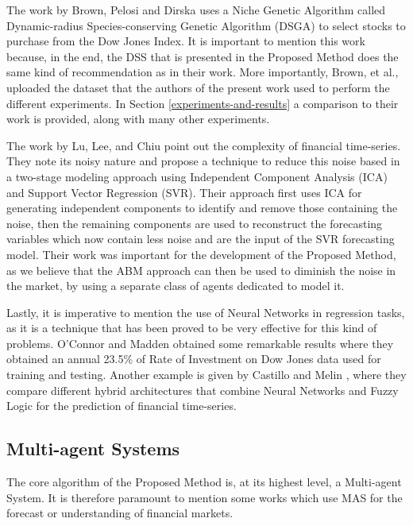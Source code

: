 \documentclass[12pt,journal,draftcls,onecolumn]{IEEEtran}
\begin{document}
The work by Brown, Pelosi and Dirska \cite{brown2013dynamic} uses a Niche Genetic Algorithm called Dynamic-radius Species-conserving Genetic Algorithm (DSGA) to select stocks to purchase from the Dow Jones Index. It is important to mention this work because, in the end, the DSS that is presented in the Proposed Method does the same kind of recommendation as in their work. More importantly, Brown, et al., uploaded the dataset that the authors of the present work used to perform the different experiments. In Section \ref{experiments-and-results} a comparison to their work is provided, along with many other experiments.

The work by Lu, Lee, and Chiu \cite{Lu2009} point out the complexity of financial time-series. They note its noisy nature and propose a technique to reduce this noise based in a two-stage modeling approach using Independent Component Analysis (ICA) and Support Vector Regression (SVR). Their approach first uses ICA for generating independent components to identify and remove those containing the noise, then the remaining components are used to reconstruct the forecasting variables which now contain less noise and are the input of the SVR forecasting model. Their work was important for the development of the Proposed Method, as we believe that the ABM approach can then be used to diminish the noise in the market, by using a separate class of agents dedicated to model it.

Lastly, it is imperative to mention the use of Neural Networks in regression tasks, as it is a technique that has been proved to be very effective for this kind of problems. O'Connor and Madden \cite{Connor2005} obtained some remarkable results where they obtained an annual 23.5\% of Rate of Investment on Dow Jones data used for training and testing. Another example is given by Castillo and Melin \cite{castillo2001simulation}, where they compare different hybrid architectures that combine Neural Networks and Fuzzy Logic for the prediction of financial time-series.

\subsection{Multi-agent Systems}
\label{multi-agent-systems}

The core algorithm of the Proposed Method is, at its highest level, a Multi-agent System. It is therefore paramount to mention some works which use MAS for the forecast or understanding of financial markets.
\end{document}
